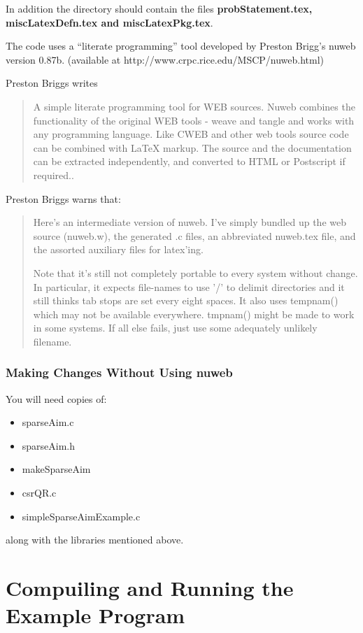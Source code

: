 \documentclass{article}
\begin{document}
In addition the directory should contain the files
{\bf probStatement.tex, miscLatexDefn.tex and miscLatexPkg.tex}.

The code uses a ``literate programming'' tool developed by
Preston Brigg's nuweb version 0.87b.
(available at http://www.crpc.rice.edu/MSCP/nuweb.html)

Preston Briggs writes
\begin{quote}
  A simple literate programming tool for WEB sources. Nuweb combines the
functionality of the original WEB tools - weave and tangle and works with any
programming language. Like CWEB and other web tools source code can be combined
with LaTeX markup. The source and the documentation can be extracted
independently, and converted to HTML or Postscript if required..
\end{quote}


Preston Briggs warns that:
\begin{quote}
  Here's an intermediate version of nuweb.  I've simply bundled up the
web source (nuweb.w), the generated .c files, an abbreviated nuweb.tex
file, and the assorted auxiliary files for latex'ing.

Note that it's still not completely portable to every system without
change.  In particular, it expects file-names to use '/' to delimit
directories and it still thinks tab stops are set every eight spaces.
It also uses tempnam() which may not be available everywhere.
tmpnam() might be made to work in some systems.  If all else fails,
just use some adequately unlikely filename.

\end{quote}


\subsubsection{Making Changes Without Using nuweb}
\label{sec:simplerChg}
You will need copies of:
\begin{itemize}
\item sparseAim.c
\item sparseAim.h
\item makeSparseAim
\item csrQR.c
\item simpleSparseAimExample.c
\end{itemize}
along with the libraries mentioned above.


\section{Compuiling and Running the Example Program}
\label{sec:compilerun}
\end{document}

